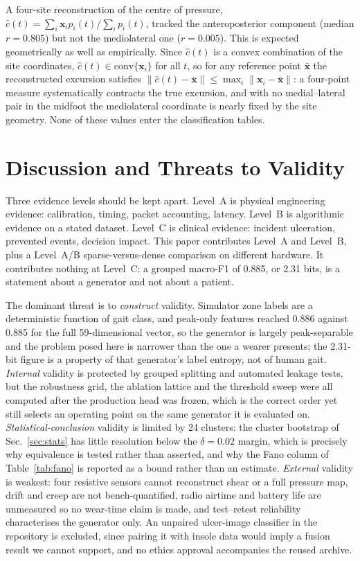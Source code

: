 \documentclass[10pt,conference,a4paper]{IEEEtran}
\begin{document}
A four-site reconstruction of the centre of pressure,
$\hat{c}(t)=\sum_i \mathbf{x}_i p_i(t)/\sum_i p_i(t)$, tracked the
anteroposterior component (median $r=0.805$) but not the mediolateral one
($r=0.005$). This is expected geometrically as well as empirically. Since
$\hat c(t)$ is a convex combination of the site coordinates,
$\hat c(t)\in\mathrm{conv}\{\mathbf{x}_i\}$ for all $t$, so for any reference
point $\bar{\mathbf{x}}$ the reconstructed excursion satisfies
$\|\hat c(t)-\bar{\mathbf{x}}\|\le\max_i\|\mathbf{x}_i-\bar{\mathbf{x}}\|$: a
four-point measure systematically contracts the true excursion, and with no
medial--lateral pair in the midfoot the mediolateral coordinate is nearly fixed
by the site geometry. None of these values enter the classification tables.

\section{Discussion and Threats to Validity}

Three evidence levels should be kept apart. Level~A is physical engineering
evidence: calibration, timing, packet accounting, latency. Level~B is
algorithmic evidence on a stated dataset. Level~C is clinical evidence:
incident ulceration, prevented events, decision impact. This paper contributes
Level~A and Level~B, plus a Level~A/B sparse-versus-dense comparison on
different hardware. It contributes nothing at Level~C: a grouped macro-F1 of
0.885, or 2.31 bits, is a statement about a generator and not about a patient.

The dominant threat is to \emph{construct} validity. Simulator zone labels are
a deterministic function of gait class, and peak-only features reached 0.886
against 0.885 for the full 59-dimensional vector, so the generator is largely
peak-separable and the problem posed here is narrower than the one a wearer
presents; the 2.31-bit figure is a property of that generator's label entropy,
not of human gait. \emph{Internal} validity is protected by grouped splitting
and automated leakage tests, but the robustness grid, the ablation lattice and
the threshold sweep were all computed after the production head was frozen,
which is the correct order yet still selects an operating point on the same
generator it is evaluated on. \emph{Statistical-conclusion} validity is limited
by 24 clusters: the cluster bootstrap of Sec.~\ref{sec:stats} has little
resolution below the $\delta=0.02$ margin, which is precisely why equivalence
is tested rather than asserted, and why the Fano column of
Table~\ref{tab:fano} is reported as a bound rather than an estimate.
\emph{External} validity is weakest: four resistive sensors cannot reconstruct
shear or a full pressure map, drift and creep are not bench-quantified, radio
airtime and battery life are unmeasured so no wear-time claim is made, and
test--retest reliability characterises the generator only. An unpaired
ulcer-image classifier in the repository is excluded, since pairing it with
insole data would imply a fusion result we cannot support, and no ethics
approval accompanies the reused archive.
\end{document}
